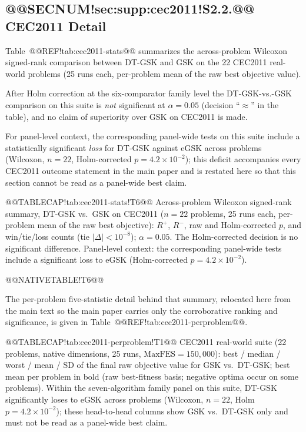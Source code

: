 \documentclass[10pt,a4paper]{article}
\newcommand{\dtgsk}{DT-GSK}
\newcommand{\egsk}{eGSK}
\begin{document}
\clearpage
\subsection{@@SECNUM!sec:supp:cec2011!S2.2.@@ CEC2011 Detail}\label{sec:supp:cec2011}

Table~@@REF!tab:cec2011-stats@@ summarizes the across-problem Wilcoxon
signed-rank comparison between \dtgsk{} and GSK on the 22 CEC2011
real-world problems (25 runs each, per-problem mean of the raw best
objective value).

After Holm correction at the six-comparator family level the
\dtgsk{}-vs.-GSK comparison on this suite is \emph{not} significant at
$\alpha = 0.05$ (decision ``$\approx$'' in the table), and no claim of
superiority over GSK on CEC2011 is made.

For panel-level context, the corresponding panel-wide tests on this
suite include a statistically significant \emph{loss} for \dtgsk{}
against \egsk{} across problems (Wilcoxon, $n = 22$, Holm-corrected
$p = 4.2 \times 10^{-2}$); this deficit accompanies every CEC2011
outcome statement in the main paper and is restated here so that this
section cannot be read as a panel-wide best claim.




@@TABLECAP!tab:cec2011-stats!T6@@ Across-problem Wilcoxon signed-rank summary, \dtgsk{} vs.\ GSK
on CEC2011 ($n = 22$ problems, 25 runs each, per-problem mean of the raw
best objective): $R^{+}$, $R^{-}$, raw and Holm-corrected $p$, and
win/tie/loss counts (tie $|\Delta| < 10^{-8}$); $\alpha = 0.05$.  The
Holm-corrected decision is no significant difference.  Panel-level context: the
corresponding panel-wide tests include a significant loss to \egsk{}
(Holm-corrected $p = 4.2 \times 10^{-2}$).

@@NATIVETABLE!T6@@



The per-problem five-statistic detail behind that summary, relocated here
from the main text so the main paper carries only the corroborative ranking
and significance, is given in Table~@@REF!tab:cec2011-perproblem@@.



@@TABLECAP!tab:cec2011-perproblem!T1@@ CEC2011 real-world suite (22 problems, native dimensions, 25 runs,
$\mathrm{MaxFES} = 150{,}000$): best / median / worst / mean / SD of the final
raw objective value for GSK vs.\ \dtgsk{}; best mean per problem in bold (raw
best-fitness basis; negative optima occur on some problems). Within the
seven-algorithm family panel on this suite, \dtgsk{} significantly loses to
\egsk{} across problems (Wilcoxon, $n = 22$, Holm $p = 4.2 \times 10^{-2}$);
these head-to-head columns show GSK vs.\ \dtgsk{} only and must not be read as
a panel-wide best claim.
\end{document}
